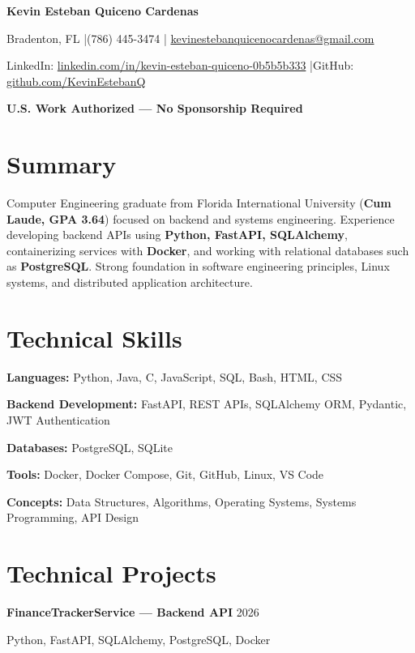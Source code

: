 \documentclass[10pt]{article}
\newcommand{\sep}{\;|\;}
\begin{document}
{\Large \textbf{Kevin Esteban Quiceno Cardenas}}

Bradenton, FL \sep (786) 445-3474 \sep
\href{mailto:kevinestebanquicenocardenas@gmail.com}{kevinestebanquicenocardenas@gmail.com}

LinkedIn: \href{https://linkedin.com/in/kevin-esteban-quiceno-0b5b5b333}{linkedin.com/in/kevin-esteban-quiceno-0b5b5b333}
\sep GitHub: \href{https://github.com/KevinEstebanQ}{github.com/KevinEstebanQ}

\textbf{U.S. Work Authorized — No Sponsorship Required}

\section{Summary}

Computer Engineering graduate from Florida International University (\textbf{Cum Laude, GPA 3.64}) focused on backend and systems engineering. Experience developing backend APIs using \textbf{Python, FastAPI, SQLAlchemy}, containerizing services with \textbf{Docker}, and working with relational databases such as \textbf{PostgreSQL}. Strong foundation in software engineering principles, Linux systems, and distributed application architecture.

\section{Technical Skills}

\textbf{Languages:}
Python, Java, C, JavaScript, SQL, Bash, HTML, CSS

\textbf{Backend Development:}
FastAPI, REST APIs, SQLAlchemy ORM, Pydantic, JWT Authentication

\textbf{Databases:}
PostgreSQL, SQLite

\textbf{Tools:}
Docker, Docker Compose, Git, GitHub, Linux, VS Code

\textbf{Concepts:}
Data Structures, Algorithms, Operating Systems, Systems Programming, API Design

\section{Technical Projects}

\textbf{FinanceTrackerService — Backend API} \hfill 2026

Python, FastAPI, SQLAlchemy, PostgreSQL, Docker
\end{document}
